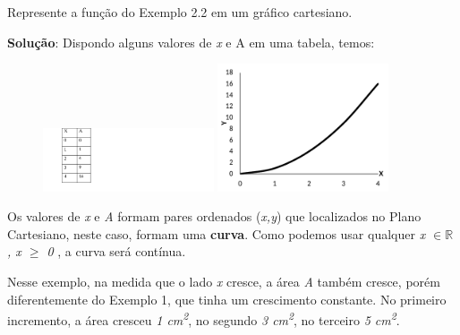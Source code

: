 \begin{texemplo}
Represente a função do Exemplo 2.2 em um gráfico cartesiano.

\textbf{Solução}: Dispondo alguns valores de \textit{x} e A em uma tabela, temos: 

\begin{figure}[H]
    \includegraphics[width=0.45\textwidth]{capitulos/funcao_do_primeiro_grau/media/image5.pdf} 
    \includegraphics[width=0.45\textwidth]{capitulos/funcao_do_primeiro_grau/media/image6.pdf}
\end{figure}

Os valores de \textit{x} e \textit{A} formam pares ordenados (\textit{x,y}) que localizados no Plano Cartesiano, neste caso, formam uma \textbf{curva}. Como podemos usar qualquer \textit{x $ \in \mathbb{R} $  , x $ \geq $  0} , a curva será contínua.

Nesse exemplo, na medida que o lado \textit{x} cresce, a área \textit{A} também cresce, porém diferentemente do Exemplo 1, que tinha um crescimento constante. No primeiro incremento, a área cresceu \textit{1 cm\textsuperscript{2}}, no segundo \textit{3 cm\textsuperscript{2}}, no terceiro \textit{5 cm\textsuperscript{2}}. \qedsymbol{}
\end{texemplo}

